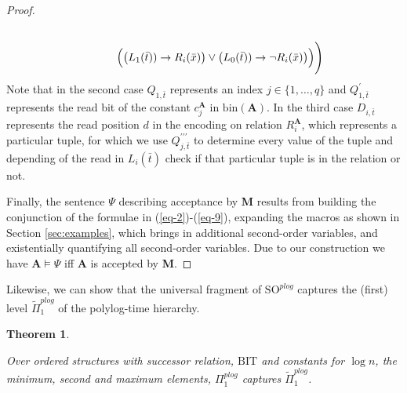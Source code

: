 \documentclass{article}
\newtheorem{theorem}{Theorem}
\begin{document}
\begin{proof}
\begin{align}
    \notag\\
    & \quad\quad\quad\quad \Big(\big(
    L_1(\bar{t}) ) \to  R_i(\bar{x})
    \big)\vee\big(
    L_0(\bar{t}) ) \to  \neg R_i(\bar{x})
    \big) \Big) \Bigg)
    \label{eq-9}
\end{align}
Note that in the second case $Q_{1,\bar{t}}$ represents an index $j \in \{ 1,\dots,q \}$ and $Q_{1,\bar{t}}^\prime$ represents the read bit of the constant $c_j^{\mathbf{A}}$ in $\mathrm{bin}(\textbf{A})$. In the third case $D_{i,\bar{t}}$ represents the read position $d$ in the encoding on relation $R_i^{\mathbf{A}}$, which represents a particular tuple, for which we use $Q_{j,\bar{t}}^{\prime\prime\prime}$ to determine every value of the tuple and depending of the read in $L_i(\bar{t})$ check if that particular tuple is in the relation or not.

Finally, the sentence $\Psi$ describing acceptance by \textbf{M} results from building the conjunction of the formulae in (\ref{eq-2})-(\ref{eq-9}), expanding the macros as shown in Section \ref{sec:examples}, which brings in additional second-order variables, and existentially quantifying all second-order variables. Due to our construction we have $\mathbf{A} \models \Psi$ iff $\mathbf{A}$ is accepted by \textbf{M}.\end{proof}


Likewise, we can show that the universal fragment of $\mathrm{SO}^{\mathit{plog}}$ captures the (first) level $\tilde{\Pi}^{\mathit{plog}}_1$ of the polylog-time hierarchy. 


\begin{theorem}\label{pedsoplog2}

Over ordered structures with successor relation, $\mathrm{BIT}$ and constants for $\log n$, the minimum, second and maximum elements, $\Pi^{\mathit{plog}}_1$ captures $\tilde{\Pi}^{\mathit{plog}}_1$.

\end{theorem}
\end{document}

